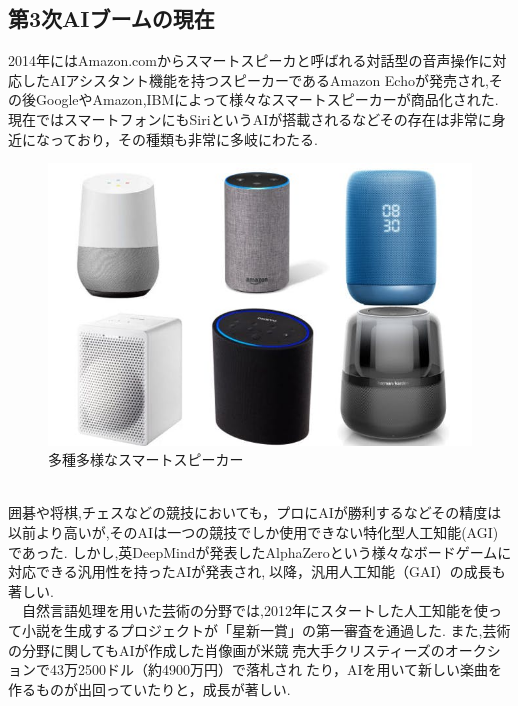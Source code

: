 \subsection{第3次AIブームの現在}
2014年にはAmazon.comからスマートスピーカと呼ばれる対話型の音声操作に対応したAIアシスタント機能を持つスピーカーであるAmazon Echoが発売され,その後GoogleやAmazon,IBMによって様々なスマートスピーカーが商品化された.
現在ではスマートフォンにもSiriというAIが搭載されるなどその存在は非常に身近になっており，その種類も非常に多岐にわたる.
\begin{figure}[!ht]
    \begin{screen}
    \begin{center}
        \includegraphics[scale=0.6, clip]{./img/smartspeaker_list.jpg}
        \caption{多種多様なスマートスピーカー}
        \label{fig:多種多様なスマートスピーカー}
    \end{center}
\end{screen}
\end{figure}\\
囲碁や将棋,チェスなどの競技においても，プロにAIが勝利するなどその精度は以前より高いが,そのAIは一つの競技でしか使用できない特化型人工知能(AGI)であった.
しかし,英DeepMindが発表したAlphaZeroという様々なボードゲームに対応できる汎用性を持ったAIが発表され,以降，汎用人工知能（GAI）の成長も著しい.\\
　自然言語処理を用いた芸術の分野では,2012年にスタートした人工知能を使って小説を生成するプロジェクトが「星新一賞」の第一審査を通過した.\cite{webpage2}
また,芸術の分野に関してもAIが作成した肖像画が米競売大手クリスティーズのオークションで43万2500ドル（約4900万円）で落札されたり，AIを用いて新しい楽曲を作るものが出回っていたりと，成長が著しい.\cite{webpage3}\\
